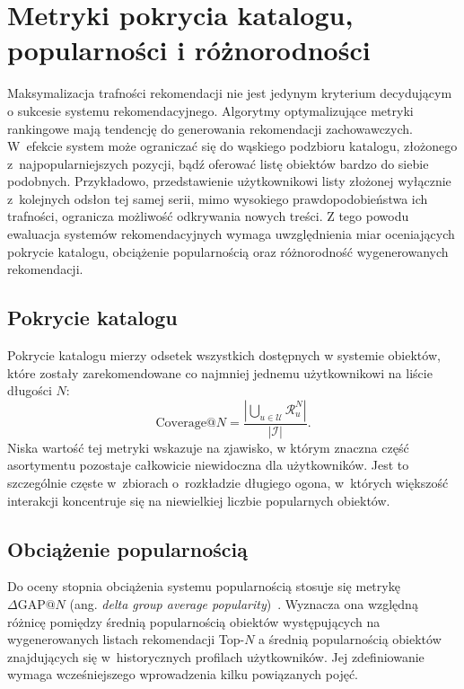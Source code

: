 \section{Metryki pokrycia katalogu, popularności i różnorodności}

Maksymalizacja trafności rekomendacji nie jest jedynym kryterium decydującym o sukcesie systemu rekomendacyjnego. Algorytmy optymalizujące metryki rankingowe mają tendencję do generowania rekomendacji zachowawczych. W~efekcie system może ograniczać się do wąskiego podzbioru katalogu, złożonego z~najpopularniejszych pozycji, bądź oferować listę obiektów bardzo do siebie podobnych. Przykładowo, przedstawienie użytkownikowi listy złożonej wyłącznie z~kolejnych odsłon tej samej serii, mimo wysokiego prawdopodobieństwa ich trafności, ogranicza możliwość odkrywania nowych treści. Z tego powodu ewaluacja systemów rekomendacyjnych wymaga uwzględnienia miar oceniających pokrycie katalogu, obciążenie popularnością oraz różnorodność wygenerowanych rekomendacji.

\subsection{Pokrycie katalogu}

Pokrycie katalogu mierzy odsetek wszystkich dostępnych w systemie obiektów, które zostały zarekomendowane co najmniej jednemu użytkownikowi na liście długości $N$:
\begin{equation}
    \text{Coverage}@N = \frac{\left| \bigcup_{u \in \mathcal{U}} \mathcal{R}_u^N \right|}{|\mathcal{I}|}.
\end{equation}
Niska wartość tej metryki wskazuje na zjawisko, w którym znaczna część asortymentu pozostaje całkowicie niewidoczna dla użytkowników. Jest to szczególnie częste w~zbiorach o~rozkładzie długiego ogona, w~których większość interakcji koncentruje się na niewielkiej liczbie popularnych obiektów.

\subsection{Obciążenie popularnością}

Do oceny stopnia obciążenia systemu popularnością stosuje się metrykę $\Delta\text{GAP}@N$ (ang. \textit{delta group average popularity})~\cite{abdollahpouri2019unfairness}. Wyznacza ona względną różnicę pomiędzy średnią popularnością obiektów występujących na wygenerowanych listach rekomendacji Top-$N$ a średnią popularnością obiektów znajdujących się w~historycznych profilach użytkowników. Jej zdefiniowanie wymaga wcześniejszego wprowadzenia kilku powiązanych pojęć.

